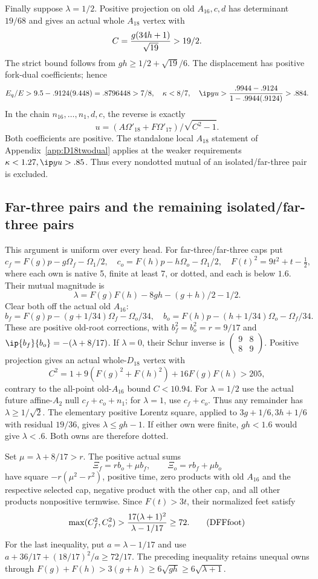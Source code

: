 Finally suppose \(\lambda=1/2\).
Positive projection on old \(A_{16},c,d\) has determinant
\(19/68\) and gives an actual whole \(A_{18}\) vertex with
\[
 C={g(34h+1)\over\sqrt{19}}>19/2 .
\]
The strict bound follows from
\(gh\ge1/2+\sqrt{19}/6\).
The displacement has positive fork-dual coefficients; hence
\[
 E_q/E>9.5-.9124(9.448)=.8796448>7/8,\quad
 \kappa<8/7,\quad
 \ip yu>{.9944-.9124\over1-.9944(.9124)}>.884 .
\]
In the chain \(n_{16},\ldots,n_1,d,c\), the reverse is exactly
\[
             u=(A\Omega'_{18}+F\Omega'_{17})/
                         \sqrt{C^2-1}.
\]
Both coefficients are positive.
The standalone local \(A_{18}\) statement of
Appendix~\ref{app:D18twodual} applies at the weaker requirements
\(\kappa<1.27,\ip yu>.85\).
Thus every nondotted mutual of an isolated/far-three pair is excluded.

\subsection{Far-three pairs and the remaining isolated/far-three pairs}
\label{app:D18farpairexits}

This argument is uniform over every head.
For far-three/far-three caps put
\[
 c_f=F(g)p-g\Omega_f-\Omega_1/2,\quad
 c_o=F(h)p-h\Omega_o-\Omega_1/2,\quad
 F(t)^2=9t^2+t-\tfrac12 ,
\]
where each own is native 5, finite at least 7, or dotted,
and each is below \(1.6\).
Their mutual magnitude is
\[
 \lambda=F(g)F(h)-8gh-(g+h)/2-1/2 .
\]
Clear both off the actual old \(A_{16}\):
\[
 b_f=F(g)p-(g+1/34)\Omega_f-\Omega_o/34,\quad
 b_o=F(h)p-(h+1/34)\Omega_o-\Omega_f/34 .
\]
These are positive old-root corrections, with
\(b_f^2=b_o^2=r=9/17\) and
\(\ip{b_f}{b_o}=-(\lambda+8/17)\).
If \(\lambda=0\), their Schur inverse is
\(\left(\begin{smallmatrix}9&8\\8&9\end{smallmatrix}\right)\).
Positive projection gives an actual whole-\(D_{18}\) vertex with
\[
 C^2=1+9(F(g)^2+F(h)^2)+16F(g)F(h)>205,
\]
contrary to the all-point old-\(A_{16}\) bound \(C<10.94\).
For \(\lambda=1/2\) use the actual future affine-\(A_2\) null
\(c_f+c_o+n_1\); for \(\lambda=1\), use \(c_f+c_o\).
Thus any remainder has \(\lambda\ge1/\sqrt2\).
The elementary positive Lorentz square, applied to
\(3g+1/6,3h+1/6\) with residual \(19/36\), gives
\(\lambda\le gh-1\).
If either own were finite, \(gh<1.6\) would give
\(\lambda<.6\).  Both owns are therefore dotted.

Set \(\mu=\lambda+8/17>r\).
The positive actual sums
\[
 \Xi_f=r b_o+\mu b_f,\qquad \Xi_o=r b_f+\mu b_o
\]
have square \(-r(\mu^2-r^2)\), positive time, zero products
with old \(A_{16}\) and the respective selected cap,
negative product with the other cap, and all other products
nonpositive termwise.
Since \(F(t)>3t\), their normalized feet satisfy
\[
 \max(C_f^2,C_o^2)>
 {17(\lambda+1)^2\over\lambda-1/17}\ge72.
\tag{DFFfoot}\label{eq:DFFfoot}
\]
For the last inequality, put \(a=\lambda-1/17\) and use
\(a+36/17+(18/17)^2/a\ge72/17\).
The preceding inequality retains unequal owns through
\(F(g)+F(h)>3(g+h)\ge6\sqrt{gh}\ge6\sqrt{\lambda+1}\).


